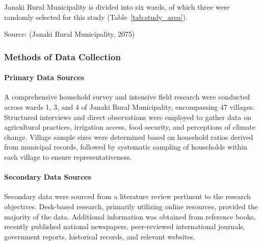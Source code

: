 Janaki Rural Municipality is divided into six wards, of which three were randomly selected for this study (Table~\ref{tab:study_area}). 

\begin{table}[ht]
\centering
\caption{Study Area with elevation and coordinates}
\label{tab:study_area}
\end{table}

Source: (Janaki Rural Municipality, 2075)

\subsubsection{Methods of Data Collection}
\paragraph{Primary Data Sources}
A comprehensive household survey and intensive field research were conducted across wards 1, 3, and 4 of Janaki Rural Municipality, encompassing 47 villages. Structured interviews and direct observations were employed to gather data on agricultural practices, irrigation access, food security, and perceptions of climate change. Village sample sizes were determined based on household ratios derived from municipal records, followed by systematic sampling of households within each village to ensure representativeness.
\paragraph{Secondary Data Sources}
Secondary data were sourced from a literature review pertinent to the research objectives. Desk-based research, primarily utilizing online resources, provided the majority of the data. Additional information was obtained from reference books, recently published national newspapers, peer-reviewed international journals, government reports, historical records, and relevant websites.
